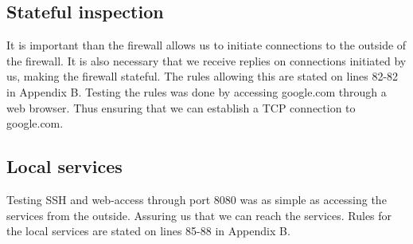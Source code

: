 \subsection{Stateful inspection}
It is important than the firewall allows us to initiate connections to the outside of the firewall. It is also necessary that we receive replies on connections initiated by us, making the firewall stateful. The rules allowing this are stated on lines 82-82 in Appendix B. Testing the rules was done by accessing google.com through a web browser. Thus ensuring that we can establish a TCP connection to google.com.

\subsection{Local services}
Testing SSH and web-access through port 8080 was as simple as accessing the services from the outside. Assuring us that we can reach the services. Rules for the local services are stated on lines 85-88 in Appendix B.








